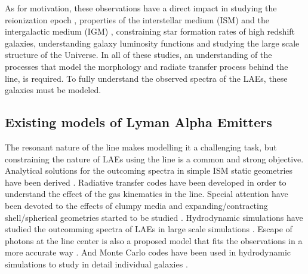 \documentclass{latex/emulateapj}
\begin{document}
As for motivation, these observations have a direct impact in studying the reionization epoch \cite{review}, properties of the interstellar medium (ISM) and the intergalactic medium (IGM) \citep{Behrens13} \citep{DijkstraKramer}, constraining star formation rates of high redshift galaxies, understanding galaxy luminosity functions \cite{Max} and studying the large scale structure of the Universe. In all of these studies, an understanding of the processes that model the morphology and radiate transfer process behind the \lya line, is required. To fully understand the observed spectra of the LAEs, these galaxies must be modeled. \\

\subsection{Existing models of Lyman Alpha Emitters}

The resonant nature of the \lya line makes modelling it a challenging task, but constraining the nature of LAEs using the line is a common and strong objective. Analytical solutions for the outcoming spectra in simple ISM static geometries have been derived \citep{Adams72, Harrington73, Neufeld90, Dijkstra06}. Radiative transfer codes \citep{DijkstraKramer, Laursen09, Verhamme06, CLARA} have been developed in order to understand the effect of the gas kinematics in the \lya line. Special attention have been devoted to  the effects of clumpy media \citep{Hansen06} and expanding/contracting shell/spherical geometries started to be studied \citep{Ahn03,Verhamme06,Dijkstra06}. Hydrodynamic simulations have studied the outcomming spectra of LAEs in large scale simulations \cite{Forero12}. Escape of \lya photons at the line center is also a proposed model that fits the observations in a more accurate way \citep{Martin2015, Garavito14, Neufeld91}. And Monte Carlo codes have been used in hydrodynamic simulations to study in detail individual galaxies \citep{Laursen09,Barnes11,Verhamme12,Yajima12}.\\
\end{document}
